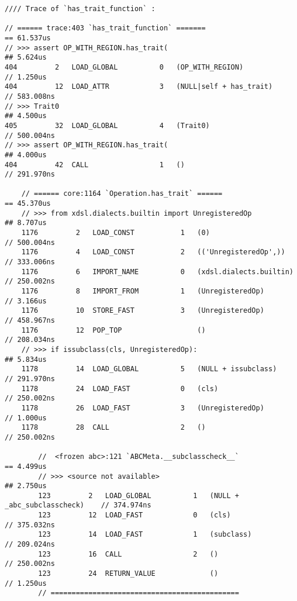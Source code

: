 \begin{code}
    \begin{verbatim}
//// Trace of `has_trait_function` :

// ====== trace:403 `has_trait_function` =======                                == 61.537us
// >>> assert OP_WITH_REGION.has_trait(                                         ## 5.624us
404         2   LOAD_GLOBAL          0   (OP_WITH_REGION)                       // 1.250us
404         12  LOAD_ATTR            3   (NULL|self + has_trait)                // 583.008ns
// >>> Trait0                                                                   ## 4.500us
405         32  LOAD_GLOBAL          4   (Trait0)                               // 500.004ns
// >>> assert OP_WITH_REGION.has_trait(                                         ## 4.000us
404         42  CALL                 1   ()                                     // 291.970ns

    // ====== core:1164 `Operation.has_trait` ======                            == 45.370us
    // >>> from xdsl.dialects.builtin import UnregisteredOp                     ## 8.707us
    1176         2   LOAD_CONST           1   (0)                               // 500.004ns
    1176         4   LOAD_CONST           2   (('UnregisteredOp',))             // 333.006ns
    1176         6   IMPORT_NAME          0   (xdsl.dialects.builtin)           // 250.002ns
    1176         8   IMPORT_FROM          1   (UnregisteredOp)                  // 3.166us
    1176         10  STORE_FAST           3   (UnregisteredOp)                  // 458.967ns
    1176         12  POP_TOP                  ()                                // 208.034ns
    // >>> if issubclass(cls, UnregisteredOp):                                  ## 5.834us
    1178         14  LOAD_GLOBAL          5   (NULL + issubclass)               // 291.970ns
    1178         24  LOAD_FAST            0   (cls)                             // 250.002ns
    1178         26  LOAD_FAST            3   (UnregisteredOp)                  // 1.000us
    1178         28  CALL                 2   ()                                // 250.002ns

        //  <frozen abc>:121 `ABCMeta.__subclasscheck__`                        == 4.499us
        // >>> <source not available>                                           ## 2.750us
        123         2   LOAD_GLOBAL          1   (NULL + _abc_subclasscheck)    // 374.974ns
        123         12  LOAD_FAST            0   (cls)                          // 375.032ns
        123         14  LOAD_FAST            1   (subclass)                     // 209.024ns
        123         16  CALL                 2   ()                             // 250.002ns
        123         24  RETURN_VALUE             ()                             // 1.250us
        // =============================================


\end{verbatim}
\end{code}

